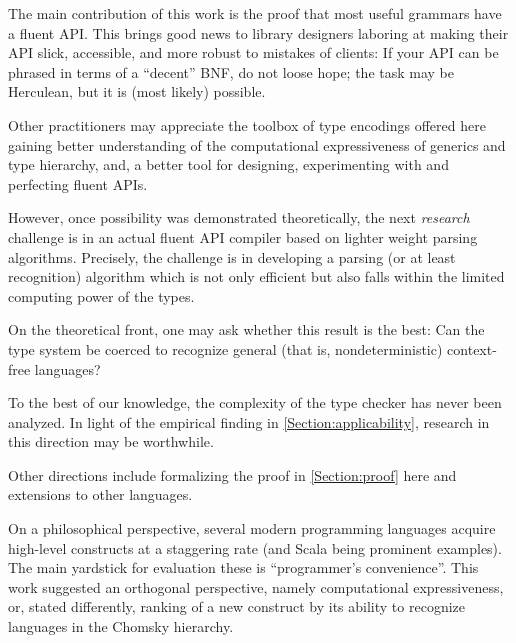 The main contribution of this work is the proof that 
  most useful grammars have a fluent API\@.
This brings good news to library designers laboring
  at making their API slick, accessible, and more
  robust to mistakes of clients: 
If your API can be phrased in terms of a ``decent''
  BNF, do not loose hope; the task may be Herculean, but it is (most likely) possible. 

Other practitioners may appreciate the toolbox of type encodings offered here 
  gaining better understanding of the computational expressiveness of
  \Java generics and type hierarchy, and, a better tool
  for designing, experimenting with and perfecting fluent APIs.

However, once possibility was demonstrated theoretically, the next \emph{research} 
    challenge is in an actual fluent API compiler based on lighter weight
  parsing algorithms.
Precisely, the challenge 
  is in developing a parsing (or at least recognition) 
  algorithm which is not only efficient but also falls within the limited computing power of the \Java types. 

On the theoretical front, one may ask whether 
  this result is the best:
Can the \Java type system be coerced to recognize
  general (that is, nondeterministic) context-free languages?

To the best of our knowledge, 
  the complexity of the \Java type checker has never been analyzed. 
In light of the empirical finding in \cref{Section:applicability},
  research in this direction may be worthwhile. 

Other directions include 
  formalizing the proof in \cref{Section:proof} here and 
  extensions to other languages.

On a philosophical perspective, several modern programming languages 
  acquire high-level constructs at a staggering rate
  (\CC and Scala being prominent examples). 
The main yardstick for evaluation these 
  is ``programmer's convenience''.
This work suggested an orthogonal perspective, namely 
  computational expressiveness, or, stated differently, 
    ranking of a new construct by its ability to recognize languages 
    in the Chomsky hierarchy.
